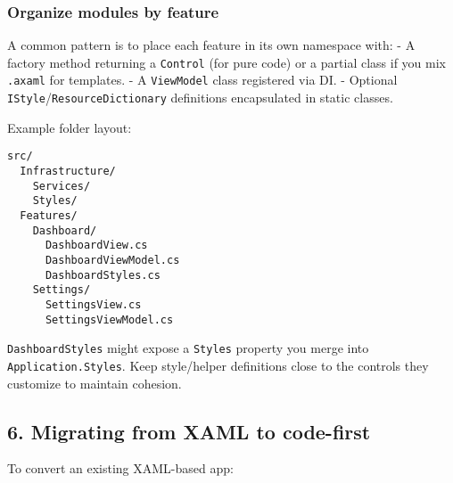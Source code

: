 \subsubsection{Organize modules by
feature}\label{organize-modules-by-feature}

A common pattern is to place each feature in its own namespace with: - A
factory method returning a \passthrough{\lstinline!Control!} (for pure
code) or a partial class if you mix \passthrough{\lstinline!.axaml!} for
templates. - A \passthrough{\lstinline!ViewModel!} class registered via
DI. - Optional
\passthrough{\lstinline!IStyle!}/\passthrough{\lstinline!ResourceDictionary!}
definitions encapsulated in static classes.

Example folder layout:

\begin{lstlisting}
src/
  Infrastructure/
    Services/
    Styles/
  Features/
    Dashboard/
      DashboardView.cs
      DashboardViewModel.cs
      DashboardStyles.cs
    Settings/
      SettingsView.cs
      SettingsViewModel.cs
\end{lstlisting}

\passthrough{\lstinline!DashboardStyles!} might expose a
\passthrough{\lstinline!Styles!} property you merge into
\passthrough{\lstinline!Application.Styles!}. Keep style/helper
definitions close to the controls they customize to maintain cohesion.

\subsection{6. Migrating from XAML to
code-first}\label{migrating-from-xaml-to-code-first}

To convert an existing XAML-based app:

